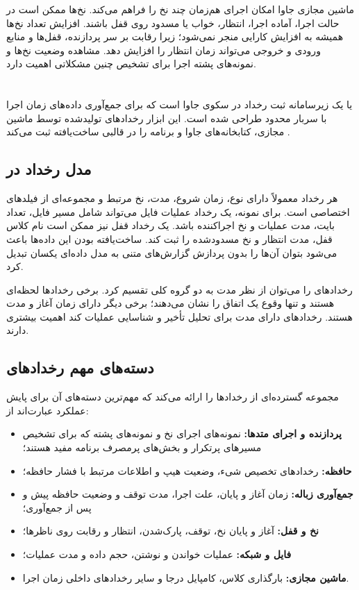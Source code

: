 ماشین مجازی جاوا امکان اجرای هم‌زمان چند نخ را فراهم می‌کند. نخ‌ها ممکن است در
حالت اجرا، آماده اجرا، انتظار، خواب یا مسدود روی قفل باشند. افزایش تعداد نخ‌ها
همیشه به افزایش کارایی منجر نمی‌شود؛ زیرا رقابت بر سر پردازنده، قفل‌ها و منابع
ورودی و خروجی می‌تواند زمان انتظار را افزایش دهد. مشاهده وضعیت نخ‌ها و نمونه‌های
پشته اجرا برای تشخیص چنین مشکلاتی اهمیت دارد.

\section{}
\label{sec:jfr}

 یا  یک زیرسامانه ثبت
رخداد در سکوی جاوا است که برای جمع‌آوری داده‌های زمان اجرا با سربار محدود طراحی
شده است. این ابزار رخدادهای تولیدشده توسط ماشین مجازی، کتابخانه‌های جاوا و
برنامه را در قالبی ساخت‌یافته ثبت می‌کند \cite{jfrdocs}.

\subsection{مدل رخداد در }

هر رخداد  معمولاً دارای نوع، زمان شروع، مدت، نخ مرتبط و مجموعه‌ای از
فیلدهای اختصاصی است. برای نمونه، یک رخداد عملیات فایل می‌تواند شامل مسیر فایل،
تعداد بایت، مدت عملیات و نخ اجراکننده باشد. یک رخداد قفل نیز ممکن است نام کلاس
قفل، مدت انتظار و نخ مسدودشده را ثبت کند. ساخت‌یافته بودن این داده‌ها باعث
می‌شود بتوان آن‌ها را بدون پردازش گزارش‌های متنی به مدل داده‌ای یکسان تبدیل کرد.

رخدادهای  را می‌توان از نظر مدت به دو گروه کلی تقسیم کرد. برخی رخدادها
لحظه‌ای هستند و تنها وقوع یک اتفاق را نشان می‌دهند؛ برخی دیگر دارای زمان آغاز و
مدت هستند. رخدادهای دارای مدت برای تحلیل تأخیر و شناسایی عملیات کند اهمیت
بیشتری دارند.

\subsection{دسته‌های مهم رخدادهای }

 مجموعه گسترده‌ای از رخدادها را ارائه می‌کند که مهم‌ترین دسته‌های آن
برای پایش عملکرد عبارت‌اند از:

\begin{itemize}
    \item \textbf{پردازنده و اجرای متدها:} نمونه‌های اجرای نخ و نمونه‌های پشته
    که برای تشخیص مسیرهای پرتکرار و بخش‌های پرمصرف برنامه مفید هستند؛
    \item \textbf{حافظه:} رخدادهای تخصیص شیء، وضعیت هیپ و اطلاعات مرتبط با فشار
    حافظه؛
    \item \textbf{جمع‌آوری زباله:} زمان آغاز و پایان، علت اجرا، مدت توقف و وضعیت
    حافظه پیش و پس از جمع‌آوری؛
    \item \textbf{نخ و قفل:} آغاز و پایان نخ، توقف، پارک‌شدن، انتظار و رقابت روی
    ناظرها؛
    \item \textbf{فایل و شبکه:} عملیات خواندن و نوشتن، حجم داده و مدت عملیات؛
    \item \textbf{ماشین مجازی:} بارگذاری کلاس، کامپایل درجا و سایر رخدادهای
    داخلی زمان اجرا.
\end{itemize}

